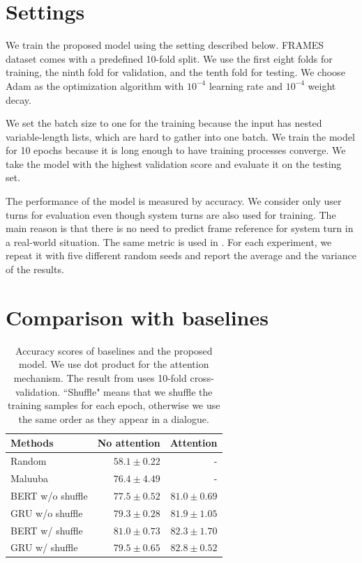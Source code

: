 \section{Settings} \label{section:setting}
We train the proposed model using the setting described below. FRAMES dataset comes with a predefined 10-fold split. We use the first eight folds for training, the ninth fold for validation, and the tenth fold for testing. We choose Adam \cite{kingma2014adam} as the optimization algorithm with $10^{-4}$ learning rate and $10^{-4}$ weight decay.

We set the batch size to one for the training because the input has nested variable-length lists, which are hard to gather into one batch. We train the model for 10 epochs because it is long enough to have training processes converge. We take the model with the highest validation score and evaluate it on the testing set.

The performance of the model is measured by accuracy. We consider only user turns for evaluation even though system turns are also used for training. The main reason is that there is no need to predict frame reference for system turn in a real-world situation. The same metric is used in \cite{schulz2017frame}. For each experiment, we repeat it with five different random seeds and report the average and the variance of the results.

\section{Comparison with baselines}
\begin{table}
    \centering
    \caption[Accuracy scores of baselines and the proposed model]{Accuracy scores of baselines and the proposed model. We use dot product for the attention mechanism. The result from \cite{schulz2017frame} uses 10-fold cross-validation. ``Shuffle" means that we shuffle the training samples for each epoch, otherwise we use the same order as they appear in a dialogue.}
    \label{tab:baselines}
    \begin{tabular}[t]{lrr}
        \toprule
        Methods & No attention & Attention \\
        \midrule
        Random & $58.1 \pm 0.22$ & - \\
        Maluuba \cite{schulz2017frame} & $76.4 \pm 4.49$ & -\\
        BERT w/o shuffle & $77.5 \pm 0.52$ & $81.0 \pm 0.69$ \\
        GRU w/o shuffle & $79.3 \pm 0.28$ & $81.9 \pm 1.05$ \\
        BERT w/ shuffle & $81.0 \pm 0.73$ & $82.3 \pm 1.70$ \\
        GRU w/ shuffle & $79.5 \pm 0.65$ & $\bm{82.8 \pm 0.52}$ \\
        \bottomrule
    \end{tabular}
\end{table}

